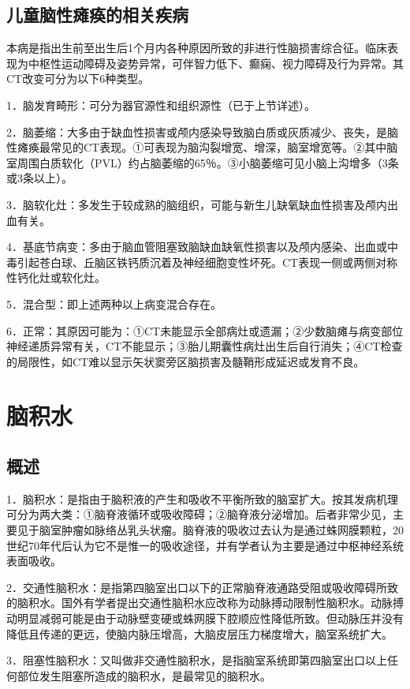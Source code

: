\subsection{儿童脑性瘫痪的相关疾病}

本病是指出生前至出生后1个月内各种原因所致的非进行性脑损害综合征。临床表现为中枢性运动障碍及姿势异常，可伴智力低下、癫痫、视力障碍及行为异常。其CT改变可分为以下6种类型。

1．脑发育畸形：可分为器官源性和组织源性（已于上节详述）。

2．脑萎缩：大多由于缺血性损害或颅内感染导致脑白质或灰质减少、丧失，是脑性瘫痪最常见的CT表现。①可表现为脑沟裂增宽、增深，脑室增宽等。②其中脑室周围白质软化（PVL）约占脑萎缩的65％。③小脑萎缩可见小脑上沟增多（3条或3条以上）。

3．脑软化灶：多发生于较成熟的脑组织，可能与新生儿缺氧缺血性损害及颅内出血有关。

4．基底节病变：多由于脑血管阻塞致脑缺血缺氧性损害以及颅内感染、出血或中毒引起苍白球、丘脑区铁钙质沉着及神经细胞变性坏死。CT表现一侧或两侧对称性钙化灶或软化灶。

5．混合型：即上述两种以上病变混合存在。

6．正常：其原因可能为：①CT未能显示全部病灶或遗漏；②少数脑瘫与病变部位神经递质异常有关，CT不能显示；③胎儿期囊性病灶出生后自行消失；④CT检查的局限性，如CT难以显示矢状窦旁区脑损害及髓鞘形成延迟或发育不良。

\section{脑积水}

\subsection{概述}

1．脑积水：是指由于脑积液的产生和吸收不平衡所致的脑室扩大。按其发病机理可分为两大类：①脑脊液循环或吸收障碍；②脑脊液分泌增加。后者非常少见，主要见于脑室肿瘤如脉络丛乳头状瘤。脑脊液的吸收过去认为是通过蛛网膜颗粒，20世纪70年代后认为它不是惟一的吸收途径，并有学者认为主要是通过中枢神经系统表面吸收。

2．交通性脑积水：是指第四脑室出口以下的正常脑脊液通路受阻或吸收障碍所致的脑积水。国外有学者提出交通性脑积水应改称为动脉搏动限制性脑积水。动脉搏动明显减弱可能是由于动脉壁变硬或蛛网膜下腔顺应性降低所致。但动脉压并没有降低且传递的更远，使脑内脉压增高，大脑皮层压力梯度增大，脑室系统扩大。

3．阻塞性脑积水：又叫做非交通性脑积水，是指脑室系统即第四脑室出口以上任何部位发生阻塞所造成的脑积水，是最常见的脑积水。

